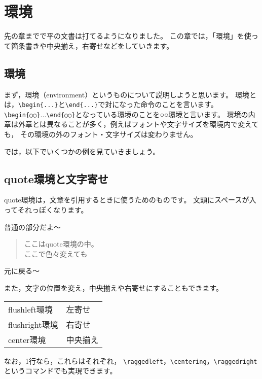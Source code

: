 \chapter{環境}

先の章までで平の文書は打てるようになりました。
この章では，「環境」を使って箇条書きや中央揃え，右寄せなどをしていきます。



\section{環境}
まず，環境（environment）というものについて説明しようと思います。
環境とは，\verb|\begin{...}|と\verb|\end{...}|で対になった命令のことを言います。
\verb|\begin{○○}|...\verb|\end{○○}|となっている環境のことを○○環境と言います。
環境の内章は外章とは異なることが多く，例えばフォントや文字サイズを環境内で変えても，
その環境の外のフォント・文字サイズは変わりません。

では，以下でいくつかの例を見ていきましょう。



\section{quote環境と文字寄せ}
quote環境は，文章を引用するときに使うためのものです。
文頭にスペースが入ってそれっぽくなります。

\begin{IOTeX}
普通の部分だよ～
\begin{quote}
ここはquote環境の中。\\
\tiny ここで色々変えても
\end{quote}
元に戻る～
\end{IOTeX}


また，文字の位置を変え，中央揃えや右寄せにすることもできます。

\begin{center}
\begin{tabular}{ll}
flushleft環境 & 左寄せ \\
flushright環境 & 右寄せ \\
center環境 & 中央揃え
\end{tabular}
\end{center}

なお，1行なら，これらはそれぞれ，
\verb|\raggedleft|，\verb|\centering|，\verb|\raggedright|
というコマンドでも実現できます。



